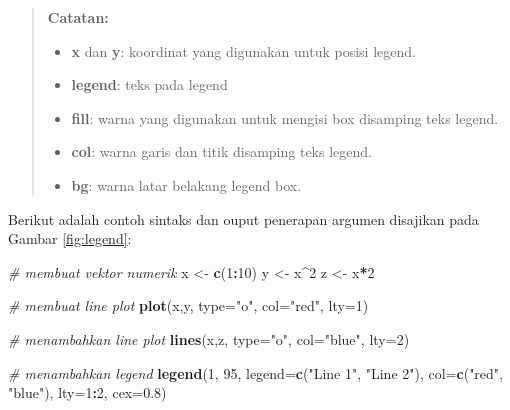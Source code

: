 \documentclass[
]{book}
\newenvironment{Shaded}{\begin{snugshade}}{\end{snugshade}}
\newcommand{\AttributeTok}[1]{\textcolor[rgb]{0.13,0.29,0.53}{#1}}
\newcommand{\CommentTok}[1]{\textcolor[rgb]{0.56,0.35,0.01}{\textit{#1}}}
\newcommand{\DecValTok}[1]{\textcolor[rgb]{0.00,0.00,0.81}{#1}}
\newcommand{\FloatTok}[1]{\textcolor[rgb]{0.00,0.00,0.81}{#1}}
\newcommand{\FunctionTok}[1]{\textcolor[rgb]{0.13,0.29,0.53}{\textbf{#1}}}
\newcommand{\NormalTok}[1]{#1}
\newcommand{\OtherTok}[1]{\textcolor[rgb]{0.56,0.35,0.01}{#1}}
\newcommand{\SpecialCharTok}[1]{\textcolor[rgb]{0.81,0.36,0.00}{\textbf{#1}}}
\newcommand{\StringTok}[1]{\textcolor[rgb]{0.31,0.60,0.02}{#1}}
\providecommand{\tightlist}{%
  \setlength{\itemsep}{0pt}\setlength{\parskip}{0pt}}
\theoremstyle{definition}
\theoremstyle{definition}
\theoremstyle{definition}
\theoremstyle{definition}
\theoremstyle{remark}
\begin{document}
\begin{quote}
\textbf{Catatan:}

\begin{itemize}
\tightlist
\item
  \textbf{x} dan \textbf{y}: koordinat yang digunakan untuk posisi legend.
\item
  \textbf{legend}: teks pada legend
\item
  \textbf{fill}: warna yang digunakan untuk mengisi box disamping teks legend.
\item
  \textbf{col}: warna garis dan titik disamping teks legend.
\item
  \textbf{bg}: warna latar belakang legend box.
\end{itemize}
\end{quote}

Berikut adalah contoh sintaks dan ouput penerapan argumen disajikan pada Gambar \ref{fig:legend}:

\begin{Shaded}
\begin{Highlighting}[]
\CommentTok{\# membuat vektor numerik}
\NormalTok{x }\OtherTok{\textless{}{-}} \FunctionTok{c}\NormalTok{(}\DecValTok{1}\SpecialCharTok{:}\DecValTok{10}\NormalTok{)}
\NormalTok{y }\OtherTok{\textless{}{-}}\NormalTok{ x}\SpecialCharTok{\^{}}\DecValTok{2}
\NormalTok{z }\OtherTok{\textless{}{-}}\NormalTok{ x}\SpecialCharTok{*}\DecValTok{2}

\CommentTok{\# membuat line plot}
\FunctionTok{plot}\NormalTok{(x,y, }\AttributeTok{type=}\StringTok{"o"}\NormalTok{, }\AttributeTok{col=}\StringTok{"red"}\NormalTok{, }\AttributeTok{lty=}\DecValTok{1}\NormalTok{)}

\CommentTok{\# menambahkan line plot}
\FunctionTok{lines}\NormalTok{(x,z, }\AttributeTok{type=}\StringTok{"o"}\NormalTok{, }\AttributeTok{col=}\StringTok{"blue"}\NormalTok{, }\AttributeTok{lty=}\DecValTok{2}\NormalTok{)}

\CommentTok{\# menambahkan legend}
\FunctionTok{legend}\NormalTok{(}\DecValTok{1}\NormalTok{, }\DecValTok{95}\NormalTok{, }\AttributeTok{legend=}\FunctionTok{c}\NormalTok{(}\StringTok{"Line 1"}\NormalTok{, }\StringTok{"Line 2"}\NormalTok{),}
       \AttributeTok{col=}\FunctionTok{c}\NormalTok{(}\StringTok{"red"}\NormalTok{, }\StringTok{"blue"}\NormalTok{), }\AttributeTok{lty=}\DecValTok{1}\SpecialCharTok{:}\DecValTok{2}\NormalTok{, }\AttributeTok{cex=}\FloatTok{0.8}\NormalTok{)}
\end{Highlighting}
\end{Shaded}
\end{document}

